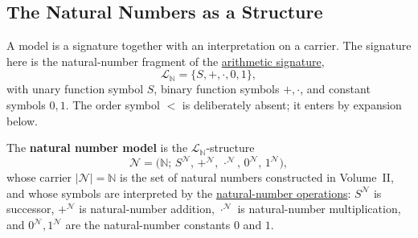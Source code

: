 %

\subsection{The Natural Numbers as a Structure}
\label{subsec:natural-numbers-as-a-structure}


\begin{remark*}[Exposition]
A model is a signature together with an interpretation on a carrier. The
signature here is the natural-number fragment of the
\hyperref[def:arithmetic-signature]{arithmetic signature},
\[
\mathcal{L}_{\mathbb{N}}=\{S,+,\cdot,0,1\},
\]
with unary function symbol $S$, binary function symbols $+,\cdot$, and
constant symbols $0,1$. The order symbol $<$ is deliberately absent; it enters
by expansion below.
\end{remark*}

\begin{definition}
\label{def:natural-number-model}
The \textbf{natural number model} is the $\mathcal{L}_{\mathbb{N}}$-structure
\[
\mathcal{N}
=
\bigl(\mathbb{N};\,
S^{\mathcal{N}},\,+^{\mathcal{N}},\,\cdot^{\mathcal{N}},
\,0^{\mathcal{N}},\,1^{\mathcal{N}}\bigr),
\]
whose carrier $|\mathcal{N}|=\mathbb{N}$ is the set of natural numbers
constructed in Volume~II, and whose symbols are interpreted by the
\hyperref[def:natural-number-operations]{natural-number operations}:
$S^{\mathcal{N}}$ is successor, $+^{\mathcal{N}}$ is natural-number addition,
$\cdot^{\mathcal{N}}$ is natural-number multiplication, and
$0^{\mathcal{N}},1^{\mathcal{N}}$ are the natural-number constants $0$ and $1$.
\end{definition}

